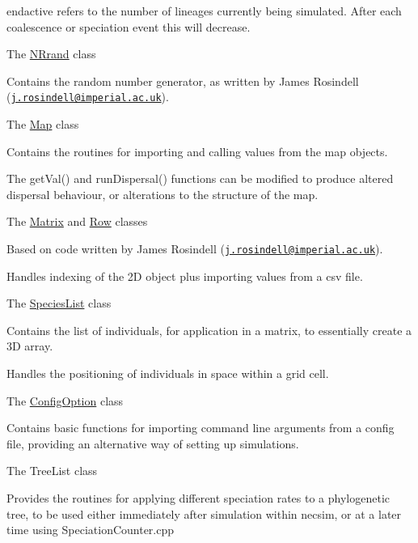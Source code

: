 \begin{DoxyItemize}
\begin{DoxyItemize}
\item {\ttfamily endactive} refers to the number of lineages currently being simulated. After each coalescence or speciation event this will decrease.
\end{DoxyItemize}
\item The {\ttfamily \hyperlink{class_n_rrand}{N\+Rrand}} class
\begin{DoxyItemize}
\item Contains the random number generator, as written by James Rosindell (\href{mailto:j.rosindell@imperial.ac.uk}{\tt j.\+rosindell@imperial.\+ac.\+uk}).
\end{DoxyItemize}
\item The {\ttfamily \hyperlink{class_map}{Map}} class
\begin{DoxyItemize}
\item Contains the routines for importing and calling values from the map objects.
\item The {\ttfamily get\+Val()} and {\ttfamily run\+Dispersal()} functions can be modified to produce altered dispersal behaviour, or alterations to the structure of the map.
\end{DoxyItemize}
\item The {\ttfamily \hyperlink{class_matrix}{Matrix}} and {\ttfamily \hyperlink{class_row}{Row}} classes
\begin{DoxyItemize}
\item Based on code written by James Rosindell (\href{mailto:j.rosindell@imperial.ac.uk}{\tt j.\+rosindell@imperial.\+ac.\+uk}).
\item Handles indexing of the 2D object plus importing values from a csv file.
\end{DoxyItemize}
\item The {\ttfamily \hyperlink{class_species_list}{Species\+List}} class
\begin{DoxyItemize}
\item Contains the list of individuals, for application in a matrix, to essentially create a 3D array.
\item Handles the positioning of individuals in space within a grid cell.
\end{DoxyItemize}
\item The {\ttfamily \hyperlink{class_config_option}{Config\+Option}} class
\begin{DoxyItemize}
\item Contains basic functions for importing command line arguments from a config file, providing an alternative way of setting up simulations.
\end{DoxyItemize}
\item The {\ttfamily Tree\+List} class
\begin{DoxyItemize}
\item Provides the routines for applying different speciation rates to a phylogenetic tree, to be used either immediately after simulation within necsim, or at a later time using Speciation\+Counter.\+cpp
\end{DoxyItemize}
\end{DoxyItemize}

